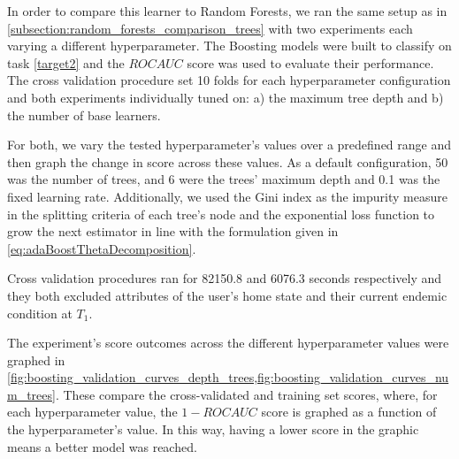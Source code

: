 In order to compare this learner to Random Forests, we ran the same setup as in \cref{subsection:random_forests_comparison_trees}
with two experiments each varying a different hyperparameter.
The Boosting models were built to classify on task \cref{target2} and the $ROC AUC$ score was used to evaluate their performance.
The cross validation procedure set 10 folds for each hyperparameter
 configuration and both experiments individually tuned on: a) the maximum tree depth and b) the number of base learners.

For both, we vary the tested hyperparameter's values over a predefined range and then graph the change in score across these values.
As a default configuration, 50 was the number of trees, and 6 were the trees' maximum depth and 0.1 was the fixed learning rate.
Additionally, we used the Gini index as the impurity measure in the splitting criteria of each tree's node and the exponential loss function to grow the next estimator in line with the formulation given in \cref{eq:adaBoostThetaDecomposition}.

Cross validation procedures ran for 82150.8
 and 6076.3 seconds respectively and they both excluded attributes of the user's home state and their current endemic condition at $T_1$.

The experiment's score outcomes across the different hyperparameter values were graphed in \cref{fig:boosting_validation_curves_depth_trees,fig:boosting_validation_curves_num_trees}.
These compare the cross-validated and training set scores, where, for each hyperparameter value, the $1-ROC AUC$ score is graphed as a function of the hyperparameter's value.
In this way, having a lower score in the graphic means a better model was reached.

